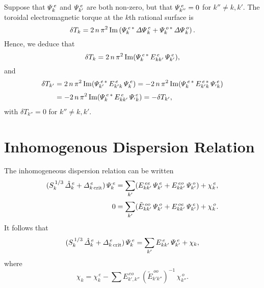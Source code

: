 \documentclass[12pt,prb,aps,notitlepage]{revtex4-1}
\begin{document}
Suppose that ${\mit\Psi}_k^{\,e}$ and ${\mit\Psi}_{k'}^{\,e}$ are both non-zero, but that ${\mit\Psi}^{\,e}_{k''}=0$ for $k''\neq k, k'$. 
The toroidal electromagnetic torque at the $k$th rational surface is
\begin{equation}
\delta T_k =  2\,n\,\pi^2\,{\rm Im}\left({\mit\Psi}^{\,e\,\ast}_k \,{\mit\Delta\Psi}^{\,e}_k +{\mit\Psi}^{\,o\,\ast}_k \,{\mit\Delta\Psi}^{\,o}_k\right).
\end{equation}
Hence, we deduce that
\begin{equation}
\delta T_k = 2\,n\,\pi^2\,{\rm Im}({\mit\Psi}_k^{\,e\,\ast}\,E^{\,e}_{kk'}\,{\mit\Psi}_{k'}^{\,e}),
\end{equation}
and
\begin{align}
\delta T_{k'} &= 2\,n\,\pi^2\,{\rm Im}({\mit\Psi}_{k'}^{\,e\,\ast}\,E^{\,e}_{k'k}\,{\mit\Psi}_{k}^{\,e}) = -  2\,n\,\pi^2\,{\rm Im}({\mit\Psi}_{k}^{\,e\,\ast}\,E^{\,e\,\ast}_{k'k}\,{\mit\Psi}_{'k}^{\,e}) 
\nonumber\\[0.5ex]
&= -  2\,n\,\pi^2\,{\rm Im}({\mit\Psi}_{k}^{\,e\,\ast}\,E^{\,e}_{kk'}\,{\mit\Psi}_{'k}^{\,e}) = -\delta T_{k'},
\end{align}
with $\delta T_{k''}=0$ for $k''\neq k, k'$. 

\section{Inhomogenous Dispersion Relation}
The inhomogeneous dispersion relation can be written
\begin{align}
(S_k^{\,1/3}\,\hat{\mit\Delta}_k^{\,e}+ {\mit\Delta}_{k\,{\rm crit}}^{\,e})\,{\mit\Psi}_k^{\,e} &= \sum_{k'}(E_{kk'}^{\,ee}\,{\mit\Psi}_{k'}^{\,e}+E_{kk'}^{\,eo}\,{\mit\Psi}_{k'}^{\,o}) + \chi^{\,e}_k,\\[0.5ex]
0&= \sum_{k'}(\tilde{E}_{kk'}^{\,oo}\,{\mit\Psi}_{k'}^{\,o}+E_{kk'}^{\,oe}\,{\mit\Psi}_{k'}^{\,e})+\chi_{k}^{\,o}.
\end{align}
It follows that
\begin{equation}
(S_k^{\,1/3}\,\hat{\mit\Delta}_k^{\,e}+ {\mit\Delta}_{k\,{\rm crit}}^{\,e})\,{\mit\Psi}_k^{\,e} =\sum_{k'} E^{\,e}_{kk'}\,{\mit\Psi}^{\,e}_{k'}+ \chi_k,
\end{equation}
where
\begin{equation}
\chi_k = \chi^{\,e}_k - \sum E^{\,eo}_{k',k''}\,(\tilde{E}^{\,oo}_{k'k''})^{-1}\,\chi^{\,o}_{k''}.
\end{equation}
\end{document}
